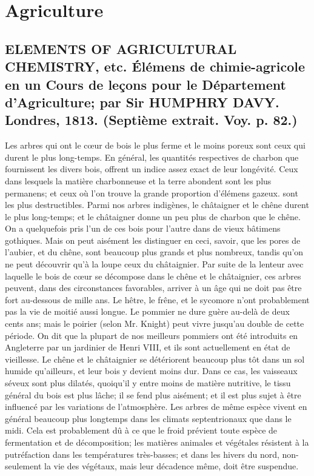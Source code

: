 \setcounter{page}{122}
\chapter{Agriculture}
\section{ELEMENTS OF AGRICULTURAL CHEMISTRY, etc. Élémens de chimie-agricole en un Cours de leçons pour le Département d'Agriculture; par Sir HUMPHRY DAVY. Londres, 1813. \large{(Septième extrait. Voy. p. 82.)}}
Les arbres qui ont le cœur de bois le plus ferme et le moins poreux sont ceux qui durent le plus long-temps.
En général, les quantités respectives de charbon que fournissent les divers bois, offrent un indice assez exact de leur longévité. Ceux dans lesquels la matière charbonneuse et la terre abondent sont les plus permanens; et ceux où l'on trouve la grande proportion d'élémens gazeux. sont les plus destructibles.
Parmi nos arbres indigènes, le châtaigner et le chêne durent le plus long-temps; et le châtaigner donne un peu plus de charbon que le chêne.
On a quelquefois pris l'un de ces bois pour l'autre dans de vieux bâtimens gothiques.\setcounter{page}{123} Mais on peut aisément les distinguer en ceci, savoir, que les pores de l'aubier, et du chêne, sont beaucoup plus grands et plus nombreux, tandis qu'on ne peut découvrir qu'à la loupe ceux du châtaignier. Par suite de la lenteur avec laquelle le bois de cœur se décompose dans le chêne et le châtaignier, ces arbres peuvent, dans des circonstances favorables, arriver à un âge qui ne doit pas être fort au-dessous de mille ans.
Le hêtre, le frêne, et le sycomore n'ont probablement pas la vie de moitié aussi longue. Le pommier ne dure guère au-delà de deux cents ans; mais le poirier (selon Mr. Knight) peut vivre jusqu'au double de cette période. On dit que la plupart de nos meilleurs pommiers ont été introduits en Angleterre par un jardinier de Henri VIII, et ils sont actuellement en état de vieillesse.
Le chêne et le châtaignier se détériorent beaucoup plus tôt dans un sol humide qu'ailleurs, et leur bois y devient moins dur. Dans ce cas, les vaisseaux séveux sont plus dilatés, quoiqu'il y entre moins de matière nutritive, le tissu général du bois est plus lâche; il se fend plus aisément; et il est plus sujet à être influencé par les variations de l'atmosphère.\setcounter{page}{124} Les arbres de même espèce vivent en général beaucoup plus longtemps dans les climats septentrionaux que dans le midi. Cela est probablement dû à ce que le froid prévient toute espèce de fermentation et de décomposition; les matières animales et végétales résistent à la putréfaction dans les températures très-basses; et dans les hivers du nord, non-seulement la vie des végétaux, mais leur décadence même, doit être suspendue.

